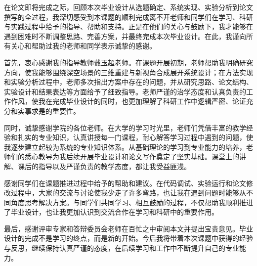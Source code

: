 
\begin{acknowledgements}
在论文即将完成之际，回顾本次毕业设计从选题确定、系统实现、实验分析到论文撰写的全过程，我深切感受到本课题的顺利完成离不开老师和同学们在学习、科研与实践过程中给予的指导、帮助和支持。正是在他们的关心与鼓励下，我才能够在遇到困难时不断调整思路、完善方案，并最终完成本次毕业设计。在此，我谨向所有关心和帮助过我的老师和同学表示诚挚的感谢。

首先，衷心感谢我的指导教师戴玉超老师。在课题开展初期，老师帮助我明确研究方向，使我能够围绕深空场景的三维重建与新视角合成展开系统设计；在方法实现和实验分析过程中，老师多次指出方案中存在的问题，并从研究思路、论文结构、实验设计和结果表达等方面给予了细致指导。老师严谨的治学态度和认真负责的工作作风，使我在完成毕业设计的同时，也更加理解了科研工作中逻辑严密、论证充分和实事求是的重要性。

同时，诚挚感谢学院的各位老师。在大学的学习时光里，老师们凭借丰富的教学经验和扎实的专业知识，认真讲授每一门课程，耐心解答学习过程中遇到的问题，使我逐步建立起较为系统的专业知识体系。从基础理论的学习到专业能力的培养，老师们的悉心教导为我后续开展毕业设计和论文写作奠定了坚实基础。课堂上的讲解、课后的指导以及严谨负责的教学态度，都让我受益匪浅。

感谢同学们在课题推进过程中给予的帮助和建议。在代码调试、实验运行和论文修改过程中，大家的交流与讨论使我少走了许多弯路，也让我在遇到问题时能够从不同角度思考解决方案。与同学们共同学习、相互鼓励的过程，不仅帮助我顺利推进了毕业设计，也让我更加认识到交流合作在学习和科研中的重要作用。

最后，感谢评审专家和答辩委员会老师在百忙之中审阅本文并提出宝贵意见。毕业设计的完成不是学习的终点，而是新的开始。今后我将带着本次课题中获得的经验与反思，继续保持认真严谨的态度，在后续学习和工作中不断提升自己的专业能力。
\end{acknowledgements}

